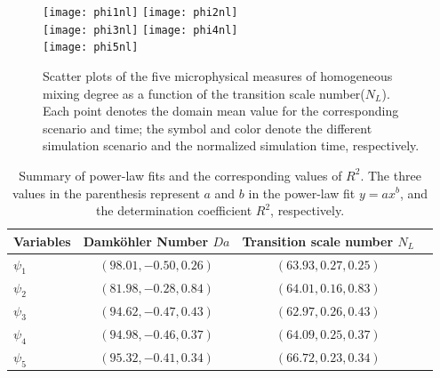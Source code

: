 \documentclass[draft,linenumbers]{agujournal}
\begin{document}
\begin{figure}[!htbp]\centering
\texttt{[image: phi1nl]}
\texttt{[image: phi2nl]}\\
\texttt{[image: phi3nl]}
\texttt{[image: phi4nl]}\\
\texttt{[image: phi5nl]}
\caption{Scatter plots of the five microphysical measures of homogeneous mixing degree as a function of the transition scale number($N_L$). Each point denotes the domain mean value for the corresponding scenario and time; the symbol and color denote the different simulation scenario and the normalized simulation time, respectively.\label{fig:PhiNL}}
\end{figure}

\begin{table}
\centering
\caption{Summary of power-law fits and the corresponding values of $R^2$. The three values in the parenthesis represent $a$ and $b$ in the power-law fit $y = ax^b$, and the determination coefficient $R^2$, respectively.}
\label{tb:fitness}
\begin{tabular}{l c c c}
\hline
Variables & Damk\"{o}hler Number $Da$  & Transition scale number $N_L$ \\
\hline
$\psi_1$  & $(98.01, -0.50, 0.26)$  & $(63.93, 0.27, 0.25)$\\
$\psi_2$  & $(81.98, -0.28, 0.84)$  & $(64.01, 0.16, 0.83)$\\
$\psi_3$  & $(94.62, -0.47, 0.43)$  & $(62.97, 0.26, 0.43)$\\
$\psi_4$  & $(94.98, -0.46, 0.37)$  & $(64.09, 0.25, 0.37)$\\
$\psi_5$  & $(95.32, -0.41, 0.34)$  & $(66.72, 0.23, 0.34)$\\
\hline
\end{tabular}
\end{table}
\end{document}
